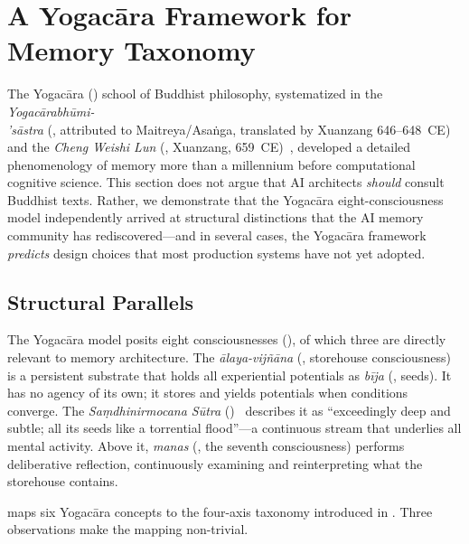 \section{A Yogac\=ara Framework for Memory Taxonomy}
\label{sec:yogacara}

The Yogac\=ara () school of Buddhist philosophy,
systematized in the \emph{Yogac\=arabh\=umi-\\'s\=astra}
(, attributed to Maitreya/Asa\.{n}ga, translated by
Xuanzang 646--648~CE)~\cite{yogacarabhumi} and the \emph{Cheng Weishi
Lun} (, Xuanzang, 659~CE)~\cite{chengweishilun},
developed a detailed phenomenology of memory more than a millennium
before computational cognitive science.  This section does not argue
that AI architects \emph{should} consult Buddhist texts.  Rather, we
demonstrate that the Yogac\=ara eight-consciousness model independently
arrived at structural distinctions that the AI memory community has
rediscovered---and in several cases, the Yogac\=ara framework
\emph{predicts} design choices that most production systems have not yet
adopted.

\subsection{Structural Parallels}
\label{sec:yogacara-structural}

The Yogac\=ara model posits eight consciousnesses
(), of which three are directly relevant to memory
architecture.  The \emph{\=alaya-vij\~n\=ana} (,
storehouse consciousness) is a persistent substrate that holds all
experiential potentials as \emph{b\=ija} (, seeds).  It has
no agency of its own; it stores and yields potentials when conditions
converge.  The \emph{Sa\d{m}dhinirmocana S\=utra}
()~\cite{samdhinirmocana} describes it as ``exceedingly
deep and subtle; all its seeds like a torrential flood''---a continuous
stream that underlies all mental activity.  Above it, \emph{manas}
(, the seventh consciousness) performs deliberative
reflection, continuously examining and reinterpreting what the
storehouse contains.

 maps six Yogac\=ara concepts to the
four-axis taxonomy introduced in .  Three
observations make the mapping non-trivial.

